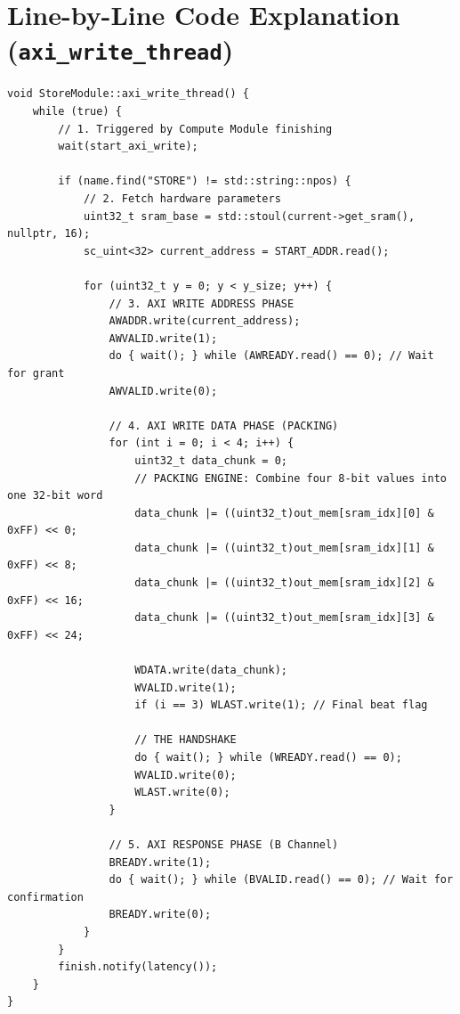 \documentclass[11pt,a4paper]{report}
\begin{document}
\section{Line-by-Line Code Explanation (\texttt{axi\_write\_thread})}
\begin{lstlisting}
void StoreModule::axi_write_thread() {
    while (true) {
        // 1. Triggered by Compute Module finishing
        wait(start_axi_write);

        if (name.find("STORE") != std::string::npos) {
            // 2. Fetch hardware parameters
            uint32_t sram_base = std::stoul(current->get_sram(), nullptr, 16);
            sc_uint<32> current_address = START_ADDR.read();

            for (uint32_t y = 0; y < y_size; y++) {
                // 3. AXI WRITE ADDRESS PHASE
                AWADDR.write(current_address);
                AWVALID.write(1);
                do { wait(); } while (AWREADY.read() == 0); // Wait for grant
                AWVALID.write(0);

                // 4. AXI WRITE DATA PHASE (PACKING)
                for (int i = 0; i < 4; i++) {
                    uint32_t data_chunk = 0;
                    // PACKING ENGINE: Combine four 8-bit values into one 32-bit word
                    data_chunk |= ((uint32_t)out_mem[sram_idx][0] & 0xFF) << 0;
                    data_chunk |= ((uint32_t)out_mem[sram_idx][1] & 0xFF) << 8;
                    data_chunk |= ((uint32_t)out_mem[sram_idx][2] & 0xFF) << 16;
                    data_chunk |= ((uint32_t)out_mem[sram_idx][3] & 0xFF) << 24;

                    WDATA.write(data_chunk);
                    WVALID.write(1);
                    if (i == 3) WLAST.write(1); // Final beat flag
                    
                    // THE HANDSHAKE
                    do { wait(); } while (WREADY.read() == 0);
                    WVALID.write(0);
                    WLAST.write(0);
                }

                // 5. AXI RESPONSE PHASE (B Channel)
                BREADY.write(1);
                do { wait(); } while (BVALID.read() == 0); // Wait for confirmation
                BREADY.write(0);
            }
        }
        finish.notify(latency());
    }
}
\end{lstlisting}
\end{document}
